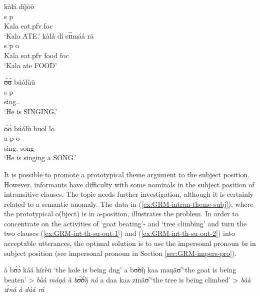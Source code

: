 \begin{exe}
\begin{exe}
\begin{exe}
{\begin{exe}
\begin{exe}
\begin{exe}
\begin{exe}
\begin{exe}
\begin{exe}
\begin{exe}
\begin{xlist}
\begin{exe}
\begin{exe}
\begin{exe}
\begin{exe}
\begin{exe}
\begin{exe}
\begin{exe}
\begin{exe}
\begin{exe}
\begin{exe}
\begin{exe}
\begin{exe}
\begin{exe}
\begin{multicols}{2}
 \ea\label{ex:GRM-clause-core-intrans}
\glll kàlá díjōō \\
       {\sc s} {\sc p}\\
 Kala eat.{\sc pfv.foc} \\
\glt  `Kala ATE.' 
\ex\label{ex:GRM-clause-core-trans}
\glll kàlá dí sɪ̀ɪ̀máá rā\\
        {\sc s} {\sc p}  {\sc o} {} \\
Kala eat.{\sc pfv}  food {\sc foc}\\
\glt  `Kala ate FOOD' 



\ex\label{ex:vp26.14.}
\glll ʊ̀ʊ̀ búólùū \\
{\sc s} {\sc p}\\
       {\psg} sing.{\ipfv.\foc} \\
\glt  `He is SINGING.' 

\ex\label{ex:vp26.15.}
\glll  ʊ̀ʊ̀ búólù būōl lō \\
{\sc a} {\sc p} {\sc o} {}\\
       {\psg}  sing.{\ipfv} song {\foc}    \\
\glt  `He is singing a SONG.' 

\z
 \z
 \end{multicols}


It is possible to promote a prototypical theme argument to the subject position.
However,  informants have difficulty with some nominals in the subject
position of
intransitive clauses.   The topic needs further investigation, although it is
certainly related to a semantic anomaly.  The data in
(\ref{ex:GRM-intran-theme-subj}), where the  prototypical {\sc o}(bject) is in
 {\sc a}-position, illustrates the problem. In order to concentrate on the 
 activities of  `goat
beating'- and `tree climbing'  and turn the two clauses
(\ref{ex:GRM-int-th-su-out-1}) and (\ref{ex:GRM-int-th-su-out-2}) into
acceptable utterances,  the optimal solution is to use the
impersonal pronoun {\it ba} in subject position  (see impersonal
pronoun in
Section \ref{sec:GRM-impers-pro}).



\ea\label{ex:GRM-intran-theme-subj}

\ea
à bʊ̀ɔ̀ káá hírèū  {\rm `the hole is being dug'}
\ex\label{ex:GRM-int-th-su-out-1}
\textasteriskcentered a bʊ̃ʊ̃ŋ   kaa maŋãʊ̃  {\rm  `the goat is being beaten' }
> {\it 
bàà máŋà à bʊ̃́ʊ̃́ŋ ná}
\ex\label{ex:GRM-int-th-su-out-2}
\textasteriskcentered a daa kaa zɪnãʊ̃  {\rm   `the tree is being climbed'}   
> {\it 
bàà zɪ́ná à dáá rá}



\end{exe}
\end{exe}
\end{exe}
\end{exe}
\end{exe}
\end{exe}
\end{exe}
\end{exe}
\end{exe}
\end{exe}
\end{exe}
\end{exe}
\end{exe}
\end{xlist}
\end{exe}
\end{exe}
\end{exe}
\end{exe}
\end{exe}
\end{exe}
\end{exe}}
\end{exe}
\end{exe}
\end{exe}
